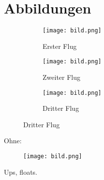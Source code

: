\documentclass[a4paper]{amsart}
\begin{document}
\section{Abbildungen}

\begin{figure}
    \caption{Kitty Warhol}
    \begin{subfigure}[b]{0.3\textwidth}
        \caption{Erster Flug}
        \texttt{[image: bild.png]}
    \end{subfigure}
    \begin{subfigure}[b]{0.3\textwidth}
        \caption{Zweiter Flug}
        \texttt{[image: bild.png]}
    \end{subfigure}
    \begin{subfigure}[b]{0.3\textwidth}
        \caption{Dritter Flug}
        \texttt{[image: bild.png]}
    \end{subfigure}
\end{figure}

Ohne:
\begin{figure}
    \texttt{[image: bild.png]}
\end{figure}

Ups, floats.
\end{document}
